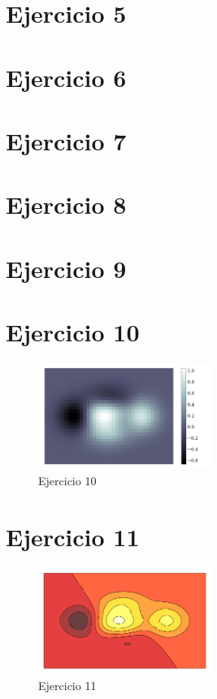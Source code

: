 \section*{Ejercicio 5}


\section*{Ejercicio 6}


\section*{Ejercicio 7}


\section*{Ejercicio 8}


\section*{Ejercicio 9}


\section*{Ejercicio 10}
\begin{figure}[H]
	\centering
	\includegraphics[width=0.5\textwidth]{ejer_10.png}
	\caption{Ejercicio 10}
	\label{fig:ejer10}
\end{figure}
	

\section*{Ejercicio 11}

\begin{figure}[H]
	\centering
	\includegraphics[width=0.5\textwidth]{ejer_11.png}
	\caption{Ejercicio 11}
	\label{fig:ejer11}
\end{figure}
	


